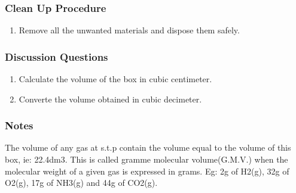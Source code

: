 \subsubsection*{Clean Up Procedure}
\begin{enumerate}
\item{Remove all the unwanted materials and dispose them safely.}
\end{enumerate}

\subsubsection*{Discussion Questions}
\begin{enumerate}
\item{Calculate the volume of the box in cubic centimeter.}
\item{Converte the volume obtained in cubic decimeter.}
\end{enumerate}

\subsubsection*{Notes}
The volume of any gas at s.t.p contain the volume equal to the volume of this box, ie: 22.4dm3. This is called gramme molecular volume(G.M.V.) when the molecular weight of a given gas is expressed in grams. Eg: 2g of H2(g), 32g of O2(g), 17g of NH3(g) and 44g of CO2(g).
